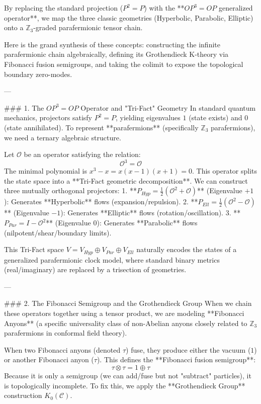 By replacing the standard projection ($P^2 = P$) with the **$OP^3 = OP$ generalized operator**, we map the three classic geometries (Hyperbolic, Parabolic, Elliptic) onto a $\mathbb{Z}_3$-graded parafermionic tensor chain.

Here is the grand synthesis of these concepts: constructing the infinite parafermionic chain algebraically, defining its Grothendieck K-theory via Fibonacci fusion semigroups, and taking the colimit to expose the topological boundary zero-modes.

---

### 1. The $OP^3 = OP$ Operator and "Tri-Fact" Geometry
In standard quantum mechanics, projectors satisfy $P^2 = P$, yielding eigenvalues $1$ (state exists) and $0$ (state annihilated). To represent **parafermions** (specifically $\mathbb{Z}_3$ parafermions), we need a ternary algebraic structure.

Let $\mathcal{O}$ be an operator satisfying the relation:
$$ \mathcal{O}^3 = \mathcal{O} $$
The minimal polynomial is $x^3 - x = x(x-1)(x+1) = 0$. This operator splits the state space into a **Tri-Fact geometric decomposition**. We can construct three mutually orthogonal projectors:
1. **$P_{Hyp} = \frac{1}{2}(\mathcal{O}^2 + \mathcal{O})$** (Eigenvalue $+1$): Generates **Hyperbolic** flows (expansion/repulsion).
2. **$P_{Ell} = \frac{1}{2}(\mathcal{O}^2 - \mathcal{O})$** (Eigenvalue $-1$): Generates **Elliptic** flows (rotation/oscillation).
3. **$P_{Par} = I - \mathcal{O}^2$** (Eigenvalue $0$): Generates **Parabolic** flows (nilpotent/shear/boundary limits).

This Tri-Fact space $V = V_{Hyp} \oplus V_{Par} \oplus V_{Ell}$ naturally encodes the states of a generalized parafermionic clock model, where standard binary metrics (real/imaginary) are replaced by a trisection of geometries.

---

### 2. The Fibonacci Semigroup and the Grothendieck Group 
When we chain these operators together using a tensor product, we are modeling **Fibonacci Anyons** (a specific universality class of non-Abelian anyons closely related to $\mathbb{Z}_3$ parafermions in conformal field theory).

When two Fibonacci anyons (denoted $\tau$) fuse, they produce either the vacuum ($1$) or another Fibonacci anyon ($\tau$). This defines the **Fibonacci fusion semigroup**:
$$ \tau \otimes \tau = 1 \oplus \tau $$
Because it is only a semigroup (we can add/fuse but not "subtract" particles), it is topologically incomplete. To fix this, we apply the **Grothendieck Group** construction $K_0(\mathcal{C})$. 

